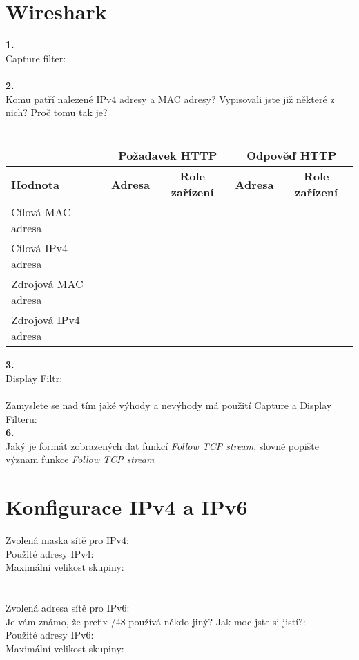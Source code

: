 \section{Wireshark}
\textbf{1.}\\
Capture filter:\\
\\
\textbf{2.}\\
Komu patří nalezené IPv4 adresy a MAC adresy? Vypisovali jste již některé z nich? Proč tomu tak je?\\
\\
\begin{tabular}{|l|c|c|c|c|}
\hline
& \multicolumn{2}{|c|}{\textbf{Požadavek HTTP}} & \multicolumn{2}{|c|}{\textbf{Odpověď HTTP}}\\
\hline
\textbf{Hodnota} & \textbf{Adresa} & \textbf{Role zařízení} & \textbf{Adresa} & \textbf{Role zařízení}\\
\hline
Cílová MAC adresa & \hspace{8em} & \hspace{6em} & \hspace{8em} & \hspace{6em} \\
\hline
Cílová IPv4 adresa & & & & \\
\hline
Zdrojová MAC adresa & & & & \\
\hline
Zdrojová IPv4 adresa & & & & \\
\hline
\end{tabular}
\vspace{2em}

\textbf{3.}\\
Display Filtr:\\
\\
Zamyslete se nad tím jaké výhody a nevýhody má použití Capture a Display
Filteru:
\\
\textbf{6.}\\
Jaký je formát zobrazených dat funkcí \emph{Follow TCP stream}, slovně popište
význam funkce \emph{Follow TCP stream}\\

\section{Konfigurace IPv4 a IPv6}

Zvolená maska sítě pro IPv4:\\
Použité adresy IPv4:\\
Maximální velikost skupiny:\\
\\
\\
Zvolená adresa sítě pro IPv6:\\
Je vám známo, že prefix /48 používá někdo jiný? Jak moc jste si jistí?:\\
Použité adresy IPv6:\\
Maximální velikost skupiny:\\
